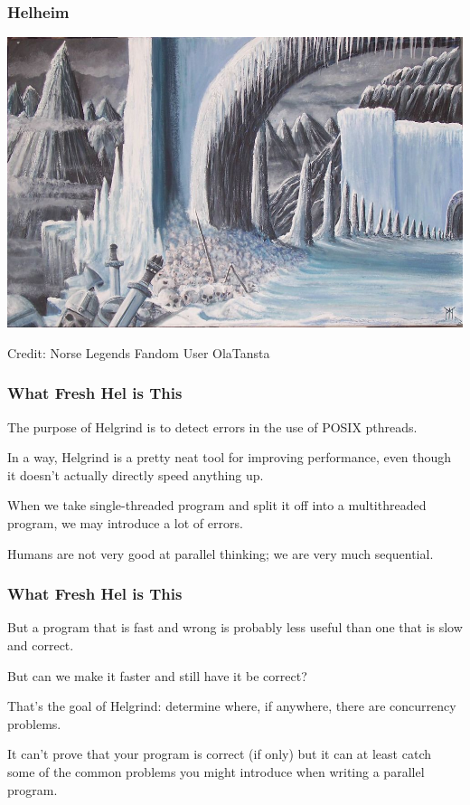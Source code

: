 \begin{frame}
	\frametitle{Helheim}

	\begin{center}
		\includegraphics[width=\textwidth]{images/helheim.jpg}
	\end{center}

	\hfill Credit: Norse Legends Fandom User OlaTansta

\end{frame}


\begin{frame}
	\frametitle{What Fresh Hel is This}

	The purpose of Helgrind is to detect errors in the use of POSIX pthreads.

	In a way, Helgrind is a pretty neat tool for improving performance, even though it doesn't actually directly speed anything up.

	When we take single-threaded program and split it off into a multithreaded program, we may introduce a lot of errors.

	Humans are not very good at parallel thinking; we are very much sequential.

\end{frame}

\begin{frame}
	\frametitle{What Fresh Hel is This}

	But a program that is fast and wrong is probably less useful than one that is slow and correct.

	But can we make it faster and still have it be correct?

	That's the goal of Helgrind: determine where, if anywhere, there are concurrency problems.

	It can't prove that your program is correct (if only) but it can at least catch some of the common problems you might introduce when writing a parallel program.

\end{frame}

